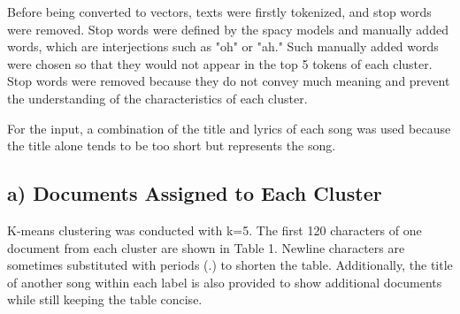 \documentclass[a4paper,11pt]{article}
\begin{document}
Before being converted to vectors, texts were firstly tokenized, and stop words were removed.
Stop words were defined by the spacy models and manually added words, which are interjections such as "oh" or "ah."
Such manually added words were chosen so that they would not appear in the top 5 tokens of each cluster.
Stop words were removed because they do not convey much meaning and prevent the understanding of the characteristics of each cluster.

For the input, a combination of the title and lyrics of each song was used because the title alone tends to be too short but represents the song.

\subsection{a) Documents Assigned to Each Cluster}
K-means clustering was conducted with k=5.
The first 120 characters of one document from each cluster are shown in Table 1.
Newline characters are sometimes substituted with periods (.) to shorten the table.
Additionally, the title of another song within each label is also provided to show additional documents while still keeping the table concise.
\end{document}

